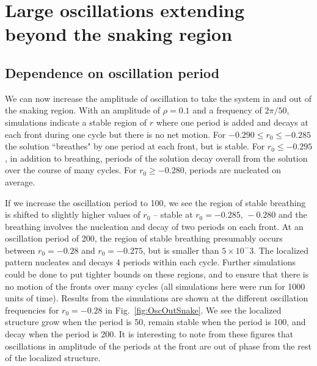 \documentclass[pre,preprint,superscriptaddress]{revtex4-1}
\begin{document}
\section{Large oscillations extending beyond the snaking region}
\subsection{Dependence on oscillation period}
We can now increase the amplitude of oscillation to take the system in and out of the snaking region.  With an amplitude of $\rho=0.1$ and a frequency of $2\pi/50$, simulations indicate a stable region of $r$ where one period is added and decays at each front during one cycle but there is no net motion. For $ -0.290\le r_0\le-0.285$ the solution ``breathes" by one period at each front, but is stable.  For $r_0 \le -0.295$, in addition to breathing, periods of the solution decay overall from the solution over the course of many cycles. For $r_0 \ge -0.280$,  periods are nucleated on average. 

If we increase the oscillation period to 100, we see the region of stable breathing is shifted to slightly higher values of $r_0$ -- stable at $r_0=-0.285, \, -0.280$ and the breathing involves the nucleation and decay of two periods on each front.  At an oscillation period of 200, the region of stable breathing presumably  occurs between $r_0=-0.28$ and $r_0=-0.275$, but is smaller than $5\times 10^-3$.  The localized pattern nucleates and decays 4 periods within each cycle.  Further simulations could be done to put tighter bounds on these regions, and to ensure that there is no motion of the fronts over many cycles (all simulations here were run for 1000 units of time).   Results from the simulations are shown at the different oscillation frequencies for $r_0=-0.28$ in Fig.~\ref{fig:OscOutSnake}.  We see the localized structure grow when the period is 50, remain stable when the period is 100, and decay when the period is 200.   It is interesting to note from these figures that oscillations in amplitude of the periods at the front are out of phase from the rest of the localized structure.
\end{document}
